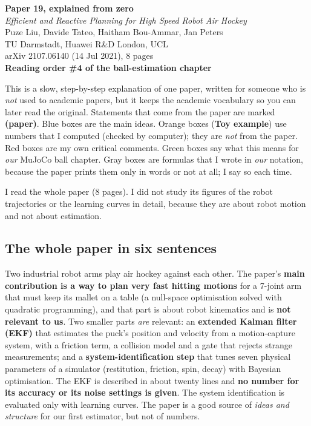 \documentclass[11pt,a4paper]{article}
\begin{document}
\setcounter{tocdepth}{1}

\begin{center}
{\LARGE\bfseries\color{cblue} Paper 19, explained from zero}\\[0.6em]
{\large \textit{Efficient and Reactive Planning for High Speed Robot Air Hockey}}\\[0.5em]
Puze Liu, Davide Tateo, Haitham Bou-Ammar, Jan Peters\\
TU Darmstadt, Huawei R\&D London, UCL\\
arXiv 2107.06140 (14 Jul 2021), 8 pages\\[0.4em]
\textbf{Reading order \#4 of the ball-estimation chapter}
\end{center}

\begin{idea}
This is a slow, step-by-step explanation of one paper, written for someone who is \emph{not}
used to academic papers, but it keeps the academic vocabulary so you can later read the
original. Statements that come from the paper are marked \textbf{(paper)}. Blue boxes are the
main ideas. Orange boxes (\textbf{Toy example}) use numbers that I computed (checked by
computer); they are \emph{not} from the paper. Red boxes are my own critical comments. Green
boxes say what this means for \emph{our} MuJoCo ball chapter. Gray boxes are formulas that I wrote
in \emph{our} notation, because the paper prints them only in words or not at all; I say so each time.

I read the whole paper (8 pages). I did not study its figures of the robot trajectories or the
learning curves in detail, because they are about robot motion and not about estimation.
\end{idea}

\subsection*{The whole paper in six sentences}
Two industrial robot arms play air hockey against each other. The paper's \textbf{main
contribution is a way to plan very fast hitting motions} for a 7-joint arm that must keep its mallet
on a table (a null-space optimisation solved with quadratic programming), and that part is about
robot kinematics and is \textbf{not relevant to us}. Two smaller parts \emph{are} relevant: an
\textbf{extended Kalman filter (EKF)} that estimates the puck's position and velocity from a
motion-capture system, with a friction term, a collision model and a gate that rejects strange
measurements; and a \textbf{system-identification step} that tunes seven physical parameters of a
simulator (restitution, friction, spin, decay) with Bayesian optimisation. The EKF is described in
about twenty lines and \textbf{no number for its accuracy or its noise settings is given}. The
system identification is evaluated only with learning curves. The paper is a good source of
\emph{ideas and structure} for our first estimator, but not of numbers.
\end{document}
